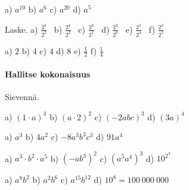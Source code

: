 \begin{tehtavasivu}
\begin{tehtava}
        \begin{vastaus}
            a) $a^{10}$ \qquad
            b) $a^6$ \qquad
            c) $a^{20}$ \qquad
            d) $a^5$
        \end{vastaus}
    \end{tehtava}

  \begin{tehtava}
        Laske. \quad
        a) $\displaystyle \frac{2^3}{2^2}$ \quad \
        b) $\displaystyle \frac{2^4}{2^2}$ \quad \
        c) $\displaystyle \frac{2^3}{2^1}$ \quad \
        d) $\displaystyle \frac{2^3}{2^0}$ \quad \
        e) $\displaystyle \frac{2^3}{2^4}$ \quad \
        f) $\displaystyle \frac{2^3}{2^5}$
        
        \begin{vastaus}
            a) $2$ \qquad
            b) $4$ \qquad
            c) $4$ \qquad
            d) $8$ \qquad
            e) $\frac{1}{2}$ \qquad
            f) $\frac{1}{4}$
        \end{vastaus}
    \end{tehtava}

\paragraph*{Hallitse kokonaisuus}

Sievennä.

 \begin{tehtava}
        a) $(1\cdot a)^3$ \qquad
        b) $(a\cdot 2)^2$ \qquad
        c) $(-2abc)^3$ \qquad
        d) $(3a)^4$

        \begin{vastaus}
            a) $a^3$ \qquad
            b) $4a^2$ \qquad
            c) $-8a^3b^3c^3$ \qquad
            d) $91a^4$
        \end{vastaus}
    \end{tehtava}


 \begin{tehtava}
        a) $a^3\cdot b^2\cdot a^5$ \qquad 
        b) $(-ab^3)^2$ \qquad 
        c) $(a^5a^4)^3$ \qquad 
        d) $10^{2^3}$

        \begin{vastaus}
            a) $a^8b^2$ \qquad
            b) $a^2b^6$ \qquad
            c) $a^{15}b^{12}$ \qquad
            d) $10^8 = 100~000~000$
        \end{vastaus}
    \end{tehtava}


\end{tehtavasivu}
